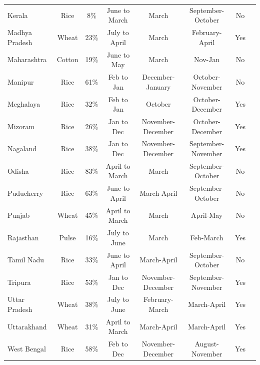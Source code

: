\documentclass[12pt,letterpaper]{article}
\newcommand{\0}{\ensuremath{\mbox{\boldmath $0$}}}
\begin{document}
{\begin{table}[t]
\begin{center}
{{\begin{tabular}{lccccccc}
Kerala &       Rice &        8\% & June to March &      March & September-October &         No \\
Madhya Pradesh &      Wheat &       23\% & July to April &      March & February-April &        Yes \\
Maharashtra &     Cotton &       19\% & June to May &      March &    Nov-Jan &         No \\
Manipur &       Rice &       61\% & Feb to Jan & December-January & October-November &         No \\
Meghalaya &       Rice &       32\% & Feb to Jan &   October  & October-December &        Yes \\
Mizoram &       Rice &       26\% & Jan to Dec & November-December & October-December &        Yes \\
Nagaland &       Rice &       38\% & Jan to Dec & November-December & September-November &        Yes \\
Odisha &       Rice &       83\% & April to March &      March & September-October &         No \\
Puducherry &       Rice &       63\% & June to April & March-April & September-October &         No \\
Punjab &      Wheat &       45\% & April to March &      March &  April-May &         No \\
Rajasthan &      Pulse &       16\% & July to June &      March &  Feb-March &        Yes \\
Tamil Nadu &       Rice &       33\% & June to April & March-April & September-October &         No \\
Tripura &       Rice &       53\% & Jan to Dec & November-December & September-November &        Yes \\
Uttar Pradesh &      Wheat &       38\% & July to June & February-March & March-April &        Yes \\
Uttarakhand &      Wheat &       31\% & April to March & March-April & March-April &        Yes \\
West Bengal &       Rice &       58\% & Feb to Dec & November-December & August-November &        Yes \\
\hline
\end{tabular}}}
\end{center}
\end{table}

}
\end{document}
